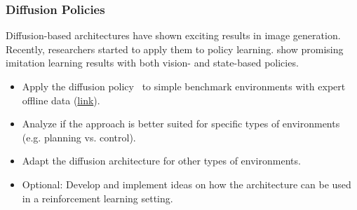 \documentclass[a4paper]{article}
\begin{document}
\subsubsection{Diffusion Policies}
Diffusion-based architectures have shown exciting results in image generation.
Recently, researchers started to apply them to policy learning. 
\citet{Chi2023DiffusionPolicy} show promising imitation learning results with both vision- and state-based policies.
\begin{itemize}
  \item Apply the diffusion policy~\cite{Chi2023DiffusionPolicy} to simple benchmark environments with expert offline data (\href{https://github.com/Farama-Foundation/d4rl/wiki/Tasks}{link}).
  \item Analyze if the approach is better suited for specific types of environments (e.g. planning vs. control).
  \item Adapt the diffusion architecture for other types of environments.
  \item Optional: Develop and implement ideas on how the architecture can be used in a reinforcement learning setting. 
\end{itemize}



\end{document}

